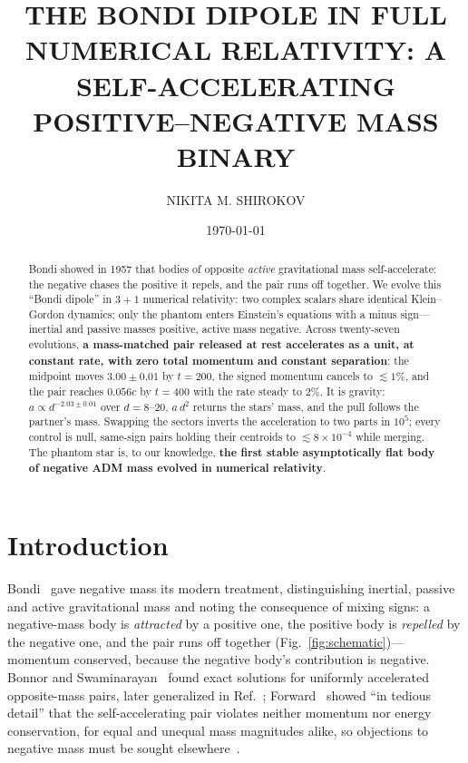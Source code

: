\documentclass[twocolumn,floatfix,aps,prd,nofootinbib]{revtex4-2}
\begin{document}
\title{\texorpdfstring{\MakeTextUppercase{The Bondi Dipole in Full Numerical Relativity: a Self-Accelerating Positive--Negative Mass Binary}}{The Bondi Dipole in Full Numerical Relativity: a Self-Accelerating Positive-Negative Mass Binary}}

\author{\MakeTextUppercase{Nikita M. Shirokov}}
\date{\today}

\begin{abstract}
Bondi showed in 1957 that bodies of opposite \emph{active} gravitational mass self-accelerate: the negative chases the positive it repels, and the pair runs off together. We evolve this ``Bondi dipole'' in $3{+}1$ numerical relativity: two complex scalars share identical Klein--Gordon dynamics; only the phantom enters Einstein's equations with a minus sign---inertial and passive masses positive, active mass negative. Across twenty-seven evolutions, \textbf{a mass-matched pair released at rest accelerates as a unit, at constant rate, with zero total momentum and constant separation}: the midpoint moves $3.00\pm0.01$ by $t=200$, the signed momentum cancels to $\lesssim1\%$, and the pair reaches $0.056c$ by $t=400$ with the rate steady to $2\%$. It is gravity: $a\propto d^{-2.03\pm0.01}$ over $d=8$--$20$, $a\,d^2$ returns the stars' mass, and the pull follows the partner's mass. Swapping the sectors inverts the acceleration to two parts in $10^5$; every control is null, same-sign pairs holding their centroids to $\lesssim8\times10^{-4}$ while merging. The phantom star is, to our knowledge, \textbf{the first stable asymptotically flat body of negative ADM mass evolved in numerical relativity}.
\end{abstract}

\maketitle

\section{Introduction}
\label{sec:intro}

Bondi~\cite{bondi1957} gave negative mass its modern treatment, distinguishing inertial, passive and active gravitational mass and noting the consequence of mixing signs: a negative-mass body is \emph{attracted} by a positive one, the positive body is \emph{repelled} by the negative one, and the pair runs off together (Fig.~\ref{fig:schematic})---momentum conserved, because the negative body's contribution is negative. Bonnor and Swaminarayan~\cite{bonnor_swami1964} found exact solutions for uniformly accelerated opposite-mass pairs, later generalized in Ref.~\cite{bicak1983}; Forward~\cite{forward1990} showed ``in tedious detail'' that the self-accelerating pair violates neither momentum nor energy conservation, for equal and unequal mass magnitudes alike, so objections to negative mass must be sought elsewhere~\cite{hoffmann1966,martins1980}.
\end{document}
